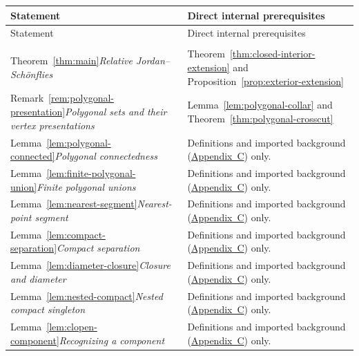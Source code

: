 \documentclass[11pt]{article}
\theoremstyle{mainplain}
\theoremstyle{mainroman}
\theoremstyle{definition}
\numberwithin{equation}{section}
\begin{document}
\renewcommand{\arraystretch}{1.12}
\begin{longtable}{@{}>{\raggedright\arraybackslash}p{}>{\raggedright\arraybackslash}p{}@{}}
\hline
Statement & Direct internal prerequisites \\
\hline
\endfirsthead
\hline
Statement & Direct internal prerequisites \\
\hline
\endhead
\hline
\multicolumn{2}{r}{\small Continued on next page} \\
\endfoot
\hline
\endlastfoot
Theorem~\ref{thm:main}\newline\emph{Relative Jordan--Schönflies} & Theorem~\ref{thm:closed-interior-extension} and Proposition~\ref{prop:exterior-extension} \\
Remark~\ref{rem:polygonal-presentation}\newline\emph{Polygonal sets and their vertex presentations} & Lemma~\ref{lem:polygonal-collar} and Theorem~\ref{thm:polygonal-crosscut} \\
Lemma~\ref{lem:polygonal-connected}\newline\emph{Polygonal connectedness} & Definitions and imported background (\hyperref[app:background]{Appendix~C}) only. \\
Lemma~\ref{lem:finite-polygonal-union}\newline\emph{Finite polygonal unions} & Definitions and imported background (\hyperref[app:background]{Appendix~C}) only. \\
Lemma~\ref{lem:nearest-segment}\newline\emph{Nearest-point segment} & Definitions and imported background (\hyperref[app:background]{Appendix~C}) only. \\
Lemma~\ref{lem:compact-separation}\newline\emph{Compact separation} & Definitions and imported background (\hyperref[app:background]{Appendix~C}) only. \\
Lemma~\ref{lem:diameter-closure}\newline\emph{Closure and diameter} & Definitions and imported background (\hyperref[app:background]{Appendix~C}) only. \\
Lemma~\ref{lem:nested-compact}\newline\emph{Nested compact singleton} & Definitions and imported background (\hyperref[app:background]{Appendix~C}) only. \\
Lemma~\ref{lem:clopen-component}\newline\emph{Recognizing a component} & Definitions and imported background (\hyperref[app:background]{Appendix~C}) only. \\

\end{longtable}
\end{document}
